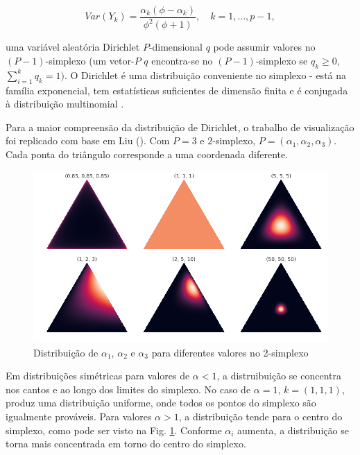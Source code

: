 \begin{equation} \label{dir:var}
Var(Y_k) = \frac{\alpha_k(\phi-\alpha_k)}{\phi^2(\phi+1)}, \quad k = 1, \dots, p-1,
\end{equation} 

\noindent
uma variável aleatória Dirichlet $P$-dimensional 
$q$ pode assumir valores no $(P-1)$-simplexo 
(um vetor-$P$ $q$ encontra-se no $(P-1)$-simplexo se 
$q_k \geq 0$,
$\sum_{i=1}^{k} q_k =1)$. 
O Dirichlet é uma distribuição conveniente no simplexo - está na família exponencial, tem estatísticas suficientes de dimensão finita e é conjugada à distribuição multinomial \cite{blei2003}.


Para a maior compreensão da distribuição de Dirichlet, o trabalho de visualização foi replicado com base em Liu (\citeyear{liu2019}). Com $P=3$ e $2$-simplexo, $P=(\alpha_1, \alpha_2, \alpha_3)$. Cada ponta do triângulo corresponde a uma coordenada diferente. 


\begin{figure}[!h]
	\centering
	\includegraphics[keepaspectratio=true,scale=0.4]{figuras/dist-diri-simplex.png}
	\caption{Distribuição de $\alpha_1$, $\alpha_2$ e $\alpha_3$ para diferentes valores no 2-simplexo}
	\label{fig08}
\end{figure}


Em distribuições simétricas para valores de $\alpha<1$, a distruibuição se concentra nos cantos e ao longo dos limites do simplexo. No caso de $\alpha=1$, $k=(1,1,1)$, produz uma distribuição uniforme, onde todos os pontos do simplexo são igualmente prováveis. Para valores $\alpha>1$, a distribuição tende para o centro do simplexo, como pode ser visto na Fig. \ref{fig08}. Conforme $\alpha_i$ aumenta, a distribuição se torna mais concentrada em torno do centro do simplexo. 


